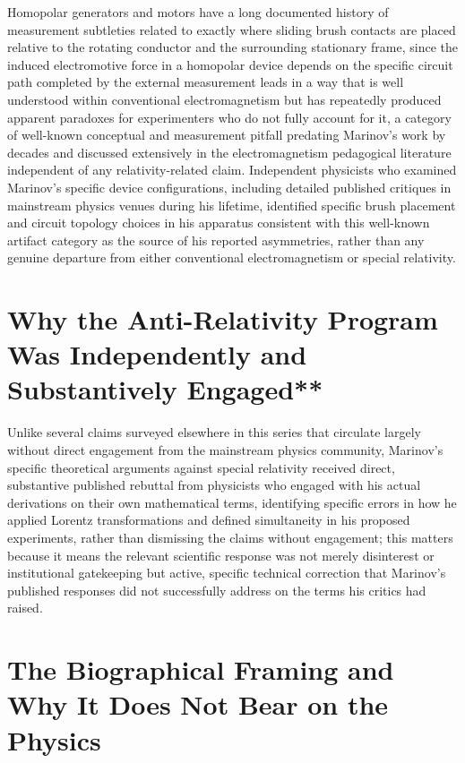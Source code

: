 \documentclass[11pt]{article}
\begin{document}
Homopolar generators and motors have a long documented history of measurement subtleties related to exactly where sliding brush contacts are placed relative to the rotating conductor and the surrounding stationary frame, since the induced electromotive force in a homopolar device depends on the specific circuit path completed by the external measurement leads in a way that is well understood within conventional electromagnetism but has repeatedly produced apparent paradoxes for experimenters who do not fully account for it, a category of well-known conceptual and measurement pitfall predating Marinov's work by decades and discussed extensively in the electromagnetism pedagogical literature independent of any relativity-related claim. Independent physicists who examined Marinov's specific device configurations, including detailed published critiques in mainstream physics venues during his lifetime, identified specific brush placement and circuit topology choices in his apparatus consistent with this well-known artifact category as the source of his reported asymmetries, rather than any genuine departure from either conventional electromagnetism or special relativity.

\section{Why the Anti-Relativity Program Was Independently and Substantively Engaged**}

Unlike several claims surveyed elsewhere in this series that circulate largely without direct engagement from the mainstream physics community, Marinov's specific theoretical arguments against special relativity received direct, substantive published rebuttal from physicists who engaged with his actual derivations on their own mathematical terms, identifying specific errors in how he applied Lorentz transformations and defined simultaneity in his proposed experiments, rather than dismissing the claims without engagement; this matters because it means the relevant scientific response was not merely disinterest or institutional gatekeeping but active, specific technical correction that Marinov's published responses did not successfully address on the terms his critics had raised.

\section{The Biographical Framing and Why It Does Not Bear on the Physics}
\end{document}
